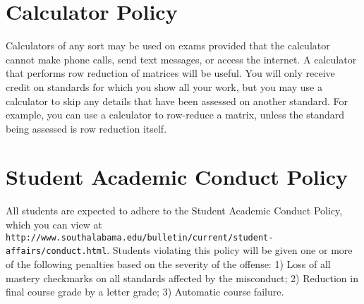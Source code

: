 \documentclass[letterpaper]{article}
\begin{document}



\section*{\fontsize{12}{15}\selectfont Calculator Policy}

Calculators of any sort may be used on exams provided that the calculator cannot make phone calls, send text messages, or access the internet. A calculator that performs row reduction of matrices will be useful.  You will only receive credit on standards for which you show all your work, but you may use a calculator to skip any details that have been assessed on another standard. For example, you can use a calculator to row-reduce a matrix, unless the standard being assessed is row reduction itself.

\section*{\fontsize{12}{15}\selectfont Student Academic Conduct Policy}
All students are expected to adhere to the Student Academic Conduct Policy, which you can view at
{\tt http://www.southalabama.edu/bulletin/current/student-affairs/conduct.html}.  Students violating this policy will be given one or more of the following penalties based on the severity of the offense:  1) Loss of all mastery checkmarks on all standards affected by the misconduct; 2) Reduction in final course grade by a letter grade; 3) Automatic course failure.
\end{document}
